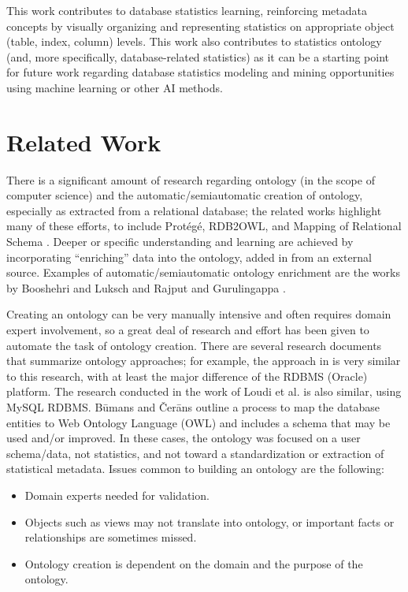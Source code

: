 \documentclass[sigconf]{acmart}
\begin{document}
This work contributes to database statistics learning, reinforcing metadata concepts by visually organizing and representing statistics on appropriate object (table, index, column) levels. This work also contributes to statistics ontology (and, more specifically, database-related statistics) as it can be a starting point for future work regarding database statistics modeling and mining opportunities using machine learning or other AI methods.

\section{Related Work}
There is a significant amount of research regarding ontology (in the scope of computer science) and the automatic/semiautomatic creation of ontology, especially as extracted from a relational database; the related works highlight many of these efforts, to include Protégé, RDB2OWL, and Mapping of Relational Schema \cite{christian2017mapping}. Deeper or specific understanding and learning are achieved by incorporating “enriching” data into the ontology, added in from an external source. Examples of automatic/semiautomatic ontology enrichment are the works by Booshehri and Luksch \cite{booshehri2015ontology} and Rajput and Gurulingappa \cite{rajput2013semi}.

Creating an ontology can be very manually intensive and often requires domain expert involvement, so a great deal of research and effort has been given to automate the task of ontology creation. There are several research documents that summarize ontology approaches; for example, the approach in \cite{christian2017mapping} is very similar to this research, with at least the major difference of the RDBMS (Oracle) platform. The research conducted in the work of Loudi et al. \cite{louhdi2013hybrid} is also similar, using MySQL RDBMS. Būmans and Čerāns \cite{bumans2018rdb2owl} outline a process to map the database entities to Web Ontology Language (OWL) and includes a schema that may be used and/or improved. In these cases, the ontology was focused on a user schema/data, not statistics, and not toward a standardization or extraction of statistical metadata. Issues common to building an ontology are the following:
\begin{itemize}
\item Domain experts needed for validation.
\item Objects such as views may not translate into ontology, or important facts or relationships are sometimes missed.
\item Ontology creation is dependent on the domain and the purpose of the ontology.
\end{itemize}
	
\end{document}
